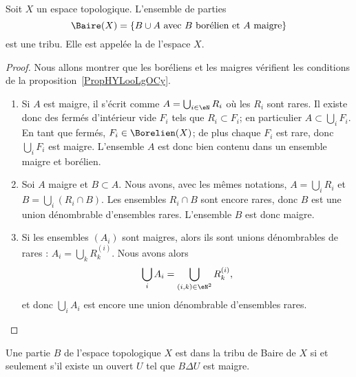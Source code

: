 \begin{proposition}
    Soit \( X\) un espace topologique. L'ensemble de parties
    \begin{equation}
        \Baire(X)=\{ B\cup A\text{ avec } B\text{ borélien et } A\text{ maigre} \}
    \end{equation}
    est une tribu. Elle est appelée la  de l'espace \( X\).
\end{proposition}

\begin{proof}
    Nous allons montrer que les boréliens et les maigres vérifient les conditions de la proposition~\ref{PropHYLooLgOCy}.
    \begin{enumerate}
        \item
            Si \( A\) est maigre, il s'écrit comme \( A=\bigcup_{i\in \eN}R_i\) où les \( R_i\) sont rares. Il existe donc des fermés d'intérieur vide \( F_i\) tels que \( R_i\subset F_i\); en particulier \( A\subset\bigcup_i F_i\). En tant que fermés, \( F_i\in\Borelien(X)\); de plus chaque \( F_i\) est rare, donc \( \bigcup_iF_i\) est maigre. L'ensemble \( A\) est donc bien contenu dans un ensemble maigre et borélien.
        \item
            Soi \( A\) maigre et \( B\subset A\). Nous avons, avec les mêmes notations, \( A=\bigcup_iR_i\) et \( B=\bigcup_i(R_i\cap B)\). Les ensembles \( R_i\cap B\) sont encore rares, donc \( B\) est une union dénombrable d'ensembles rares. L'ensemble \( B\) est donc maigre.
        \item
            Si les ensembles \( (A_i)\) sont maigres, alors ils sont unions dénombrables de rares : \( A_i=\bigcup_kR_k^{(i)}\). Nous avons alors
            \begin{equation}
                \bigcup_iA_i=\bigcup_{(i,k)\in \eN^2}R_k^{(i)},
            \end{equation}
            et donc \( \bigcup_iA_i\) est encore une union dénombrable d'ensembles rares.
    \end{enumerate}
\end{proof}

\begin{proposition}  \label{PropGRHootvAWq}
    Une partie \( B\) de l'espace topologique \( X\) est dans la tribu de Baire de \( X\) si et seulement s'il existe un ouvert \( U\) tel que \( B\Delta U\) est maigre.
\end{proposition}

